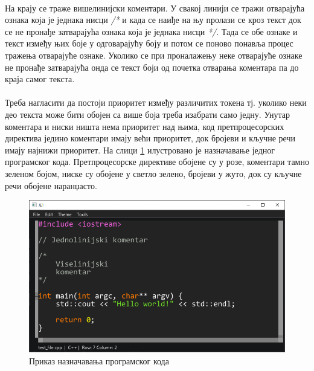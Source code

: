 \documentclass[12pt,oneside]{memoir}
\begin{document}
\paragraph{}
На крају се траже вишелинијски коментари. У свакој линији се тражи отварајућа
ознака која је једнака нисци \textit{/*} и када се наиђе на њу пролази се кроз
текст док се не пронађе затварајућа ознака која је једнака нисци \textit{*/}.
Тада се обе ознаке и текст између њих боје у одговарајућу боју и потом се поново
понавља процес тражења отварајуће ознаке. Уколико се при проналажењу неке отварајуће
ознаке не пронађе затварајућа онда се текст боји од почетка отварања коментара па до краја самог текста.

\paragraph{}
Треба нагласити да постоји приоритет између различитих токена тј.
уколико неки део текста може бити обојен са више боја треба изабрати
само једну. Унутар коментара и ниски ништа нема приоритет над њима,
код претпроцесорских директива једино коментари имају већи приоритет,
док бројеви и кључне речи имају најнижи приоритет.
На слици \ref{fig:text_highlighting} илустровано је назначавање
једног програмског кода.  Претпроцесорске директиве обојене су у розе,
коментари тамно зеленом бојом, ниске су обојене у светло зелено, бројеви у
жуто, док су кључне речи обојене наранџасто.

\begin{figure}[!ht]
	\centering
	\includegraphics[width=1.0\textwidth]{images/text_highlighting.png}
	\caption{Приказ назначавања програмског кода}
	\label{fig:text_highlighting}
\end{figure}

\literatura
\end{document}
